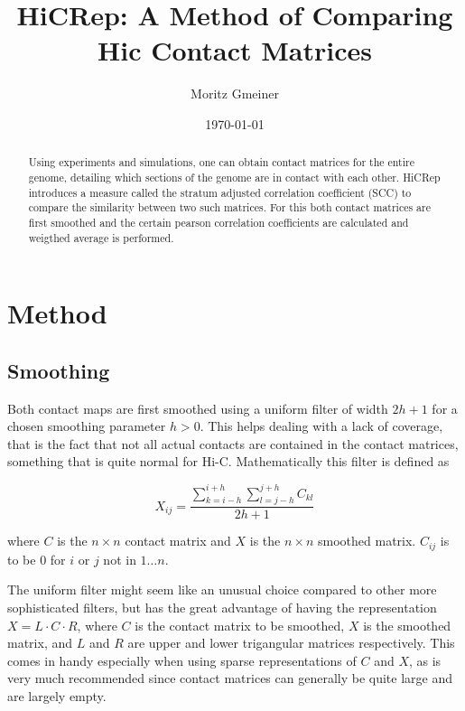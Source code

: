 \documentclass[10pt,abstract=true,titlepage=false,toc=bib]{scrartcl}
\title{HiCRep: A Method of Comparing Hic Contact Matrices}
\author{Moritz Gmeiner}
\date{\today}
\begin{document}
\maketitle

\begin{abstract}

Using experiments and simulations, one can obtain contact matrices for the entire genome, detailing which sections of the genome are in contact with each other. HiCRep\cite{yang_hicrep_2017} introduces a measure called the stratum adjusted correlation coefficient (SCC) to compare the similarity between two such matrices. For this both contact matrices are first smoothed and the certain pearson correlation coefficients are calculated and weigthed average is performed.

\end{abstract}

\section{Method} %
\label{sec:method}

\subsection{Smoothing} %
\label{subsec:smoothing}

Both contact maps are first smoothed using a uniform filter of width \(2h+1\) for a chosen smoothing parameter \(h>0\). This helps dealing with a lack of coverage, that is the fact that not all actual contacts are contained in the contact matrices, something that is quite normal for Hi-C. Mathematically this filter is defined as

\[
	X_{ij} = \frac{ \sum_{k=i-h}^{i+h} \sum_{l=j-h}^{j+h} C_{kl} }{ 2h+1 }
\]

where \(C\) is the \(n \times n\) contact matrix and \(X\) is the \(n \times n\) smoothed matrix. \(C_{ij}\) is to be 0 for \(i\) or \(j\) not in \(1 \dots n\).

The uniform filter might seem like an unusual choice compared to other more sophisticated filters, but has the great advantage of having the representation \( X = L \cdot C \cdot R \), where \(C\) is the contact matrix to be smoothed, \(X\) is the smoothed matrix, and \(L\) and \(R\) are upper and lower trigangular matrices respectively. This comes in handy especially when using sparse representations of \(C\) and \(X\), as is very much recommended since contact matrices can generally be quite large and are largely empty.
\end{document}

